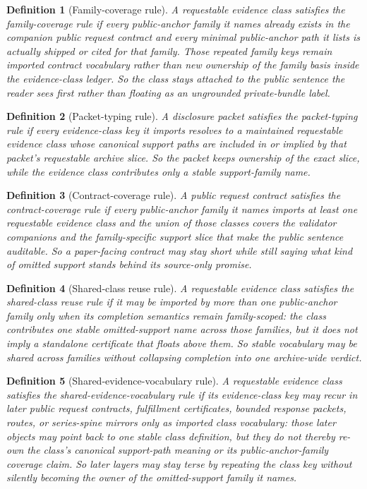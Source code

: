 \documentclass[11pt]{article}
\newtheorem{definition}{Definition}
\begin{document}
\begin{definition}[Family-coverage rule]
A requestable evidence class satisfies the \emph{family-coverage rule} if every public-anchor family it names already exists in the companion public request contract and every minimal public-anchor path it lists is actually shipped or cited for that family. Those repeated family keys remain imported contract vocabulary rather than new ownership of the family basis inside the evidence-class ledger.
So the class stays attached to the public sentence the reader sees first rather than floating as an ungrounded private-bundle label.
\end{definition}

\begin{definition}[Packet-typing rule]
A disclosure packet satisfies the \emph{packet-typing rule} if every evidence-class key it imports resolves to a maintained requestable evidence class whose canonical support paths are included in or implied by that packet's requestable archive slice.
So the packet keeps ownership of the exact slice, while the evidence class contributes only a stable support-family name.
\end{definition}

\begin{definition}[Contract-coverage rule]
A public request contract satisfies the \emph{contract-coverage rule} if every public-anchor family it names imports at least one requestable evidence class and the union of those classes covers the validator companions and the family-specific support slice that make the public sentence auditable.
So a paper-facing contract may stay short while still saying what kind of omitted support stands behind its source-only promise.
\end{definition}
\begin{definition}[Shared-class reuse rule]
A requestable evidence class satisfies the \emph{shared-class reuse rule} if it may be imported by more than one public-anchor family only when its completion semantics remain family-scoped: the class contributes one stable omitted-support name across those families, but it does not imply a standalone certificate that floats above them.
So stable vocabulary may be shared across families without collapsing completion into one archive-wide verdict.
\end{definition}


\begin{definition}[Shared-evidence-vocabulary rule]
A requestable evidence class satisfies the \emph{shared-evidence-vocabulary rule} if its evidence-class key may recur in later public request contracts, fulfillment certificates, bounded response packets, routes, or series-spine mirrors only as imported class vocabulary: those later objects may point back to one stable class definition, but they do not thereby re-own the class's canonical support-path meaning or its public-anchor-family coverage claim.
So later layers may stay terse by repeating the class key without silently becoming the owner of the omitted-support family it names.
\end{definition}
\end{document}
